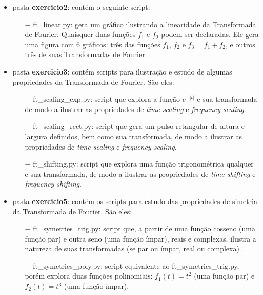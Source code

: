 \begin{itemize}

\item pasta \textbf{exercicio2}: contém o seguinte script:

\begin{itemize}
\item[$-$] ft\_linear.py: gera um gráfico ilustrando a linearidade da Transformada de Fourier. Quaisquer duas funções $f_{1}$ e $f_{2}$ podem ser declaradas. Ele gera uma figura com 6 gráficos: três das funções  $f_{1}$, $f_{2}$ e $f_{3} = f_{1} + f_{2}$, e outros três de suas Transformadas de Fourier.

\end{itemize}

\item pasta \textbf{exercicio3}: contém scripts para ilustração e estudo de algumas propriedades da Transformada de Fourier. São eles:

\begin{itemize}

\item[$-$] ft\_scaling\_exp.py: script que explora a função $e^{-|t|}$ e sua transformada de modo a ilustrar as propriedades de \textit{time scaling} e \textit{frequency scaling}.

\item[$-$] ft\_scaling\_rect.py: script que gera um pulso retangular de altura e largura definidos, bem como sua transformada, de modo a ilustrar as propriedades de \textit{time scaling} e \textit{frequency scaling}.

\item[$-$] ft\_shifting.py: script que explora uma função trigonométrica qualquer e sua transformada, de modo a ilustrar as propriedades de \textit{time shifting} e \textit{frequency shifting}.

\end{itemize}

\item pasta \textbf{exercicio5}: contém os scripts para estudo das propriedades de simetria da Transformada de Fourier. São eles:

\begin{itemize}

\item[$-$] ft\_symetries\_trig.py: script que, a partir de uma função cosseno (uma função par) e outra seno (uma função ímpar), reais e complexas, ilustra a natureza de suas transformadas (se par ou ímpar, real ou complexa). %

\item[$-$] ft\_symetries\_poly.py: script equivalente ao ft\_symetries\_trig.py, porém explora duas funções polinomiais: $f_{1}(t) = t^{2}$ (uma função par) e $f_{2}(t) = t^{3}$ (uma função ímpar).

\end{itemize}

\end{itemize}


